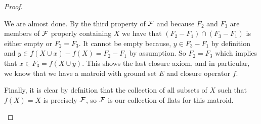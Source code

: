 \begin{proof}
\begin{enumerate}
     We are almost done. By the third property of $\mathcal{F}$ and because $F_2$ and $F_3$ are members of $\mathcal{F}$ properly containing $X$ we have that $(F_2-F_1)\cap (F_3 - F_1)$ is either empty or $F_2 = F_3$. It cannot be empty because, $y \in F_3 - F_1$ by definition and $y \in f(X\cup x)-f(X) = F_2 - F_1$ by assumption. So $F_2 = F_3$ which implies that $x \in F_3 = f(X \cup y).$ This shows the last closure axiom, and in particular, we know that we have a matroid with ground set $E$ and closure operator $f.$


     Finally, it is clear by defnition that the collection of all subsets of $X$ such that $f(X) = X$ is precisely $\mathcal{F}$, so $\mathcal{F}$ is our collection of flats for this matroid.
     
\end{enumerate}


    
\end{proof}